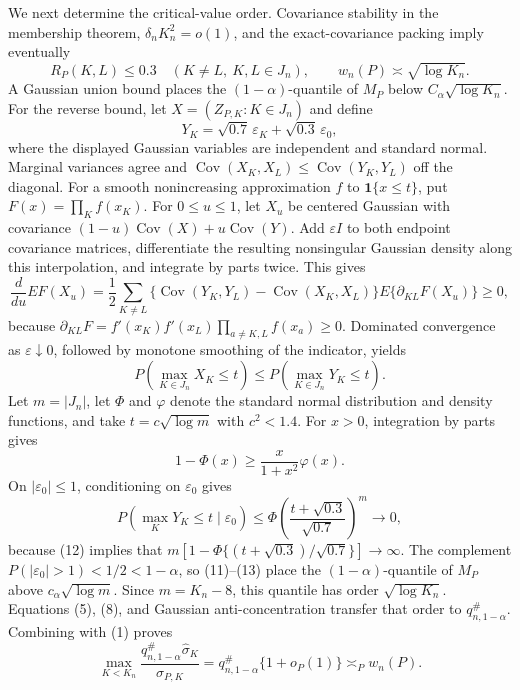 We next determine the critical-value order.  Covariance stability in the membership theorem, \(\delta_nK_n^2=o(1)\), and the exact-covariance packing imply eventually
\[
 R_P(K,L)\leq0.3\quad(K\neq L,\ K,L\in J_n),
 \qquad w_n(P)\asymp\sqrt{\log K_n}.                                        \tag{9}
\]
A Gaussian union bound places the \((1-\alpha)\)-quantile of \(M_P\) below \(C_\alpha\sqrt{\log K_n}\).  For the reverse bound, let \(X=(Z_{P,K}:K\in J_n)\) and define
\[
 Y_K=\sqrt{0.7}\,\varepsilon_K+\sqrt{0.3}\,\varepsilon_0,
\]
where the displayed Gaussian variables are independent and standard normal.  Marginal variances agree and \(\operatorname{Cov}(X_K,X_L)\leq\operatorname{Cov}(Y_K,Y_L)\) off the diagonal.  For a smooth nonincreasing approximation \(f\) to \(\mathbf1\{x\leq t\}\), put \(F(x)=\prod_Kf(x_K)\).  For \(0\leq u\leq1\), let \(X_u\) be centered Gaussian with covariance \((1-u)\operatorname{Cov}(X)+u\operatorname{Cov}(Y)\).  Add \(\varepsilon I\) to both endpoint covariance matrices, differentiate the resulting nonsingular Gaussian density along this interpolation, and integrate by parts twice.  This gives
\[
 \frac d{du}E F(X_u)=\frac12\sum_{K\neq L}
 \{\operatorname{Cov}(Y_K,Y_L)-\operatorname{Cov}(X_K,X_L)\}
 E\{\partial_{KL}F(X_u)\}\geq0,                                            \tag{10}
\]
because \(\partial_{KL}F=f'(x_K)f'(x_L)\prod_{a\neq K,L}f(x_a)\geq0\).  Dominated convergence as \(\varepsilon\downarrow0\), followed by monotone smoothing of the indicator, yields
\[
 P(\max_{K\in J_n}X_K\leq t)\leq P(\max_{K\in J_n}Y_K\leq t).             \tag{11}
\]
Let \(m=|J_n|\), let \(\Phi\) and \(\varphi\) denote the standard normal distribution and density functions, and take \(t=c\sqrt{\log m}\) with \(c^2<1.4\).  For \(x>0\), integration by parts gives
\[
 1-\Phi(x)\geq\frac{x}{1+x^2}\varphi(x).                                   \tag{12}
\]
On \(|\varepsilon_0|\leq1\), conditioning on \(\varepsilon_0\) gives
\[
 P(\max_KY_K\leq t\mid\varepsilon_0)
 \leq\Phi\!\left(\frac{t+\sqrt{0.3}}{\sqrt{0.7}}\right)^m\longrightarrow0, \tag{13}
\]
because (12) implies that \(m[1-\Phi\{(t+\sqrt{0.3})/\sqrt{0.7}\}]\to\infty\).  The complement \(P(|\varepsilon_0|>1)<1/2<1-\alpha\), so (11)--(13) place the \((1-\alpha)\)-quantile of \(M_P\) above \(c_\alpha\sqrt{\log m}\).  Since \(m=K_n-8\), this quantile has order \(\sqrt{\log K_n}\).  Equations (5), (8), and Gaussian anti-concentration transfer that order to \(q_{n,1-\alpha}^{\#}\).  Combining with (1) proves
\[
 \max_{K<K_n}\frac{q_{n,1-\alpha}^{\#}\widehat\sigma_K}{\sigma_{P,K}}
 =q_{n,1-\alpha}^{\#}\{1+o_P(1)\}\asymp_P w_n(P).                         \tag{14}
\]

